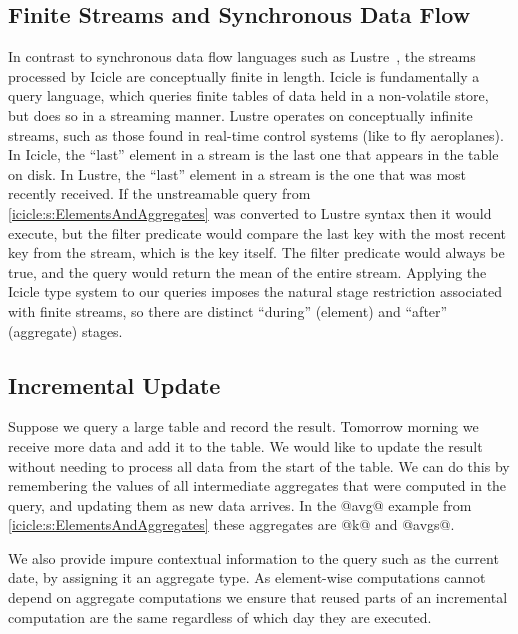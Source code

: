 \subsection{Finite Streams and Synchronous Data Flow}
In contrast to synchronous data flow languages such as {\sc Lustre}~\cite{halbwachs1991synchronous}, the streams processed by Icicle are conceptually finite in length.
Icicle is fundamentally a query language, which queries finite tables of data held in a non-volatile store, but does so in a streaming manner.
Lustre operates on conceptually infinite streams, such as those found in real-time control systems (like to fly aeroplanes).
In Icicle, the ``last'' element in a stream is the last one that appears in the table on disk.
In Lustre, the ``last'' element in a stream is the one that was most recently received.
If the unstreamable query from \cref{icicle:s:ElementsAndAggregates} was converted to Lustre syntax then it would execute, but the filter predicate would compare the last key with the most recent key from the stream, which is the key itself.
The filter predicate would always be true, and the query would return the mean of the entire stream.
Applying the Icicle type system to our queries imposes the natural stage restriction associated with finite streams, so there are distinct ``during'' (element) and ``after'' (aggregate) stages.


\subsection{Incremental Update}
Suppose we query a large table and record the result. Tomorrow morning we receive more data and add it to the table. We would like to update the result without needing to process all data from the start of the table. We can do this by remembering the values of all intermediate aggregates that were computed in the query, and updating them as new data arrives. In the @avg@ example from \cref{icicle:s:ElementsAndAggregates} these aggregates are @k@ and @avgs@. 

We also provide impure contextual information to the query such as the current date, by assigning it an aggregate type. As element-wise computations cannot depend on aggregate computations we ensure that reused parts of an incremental computation are the same regardless of which day they are executed.


